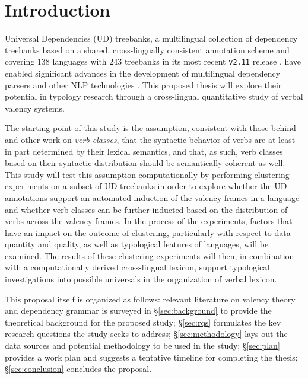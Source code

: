 \section{Introduction}\label{sec:intro}

Universal Dependencies (UD) treebanks, a multilingual collection of dependency treebanks based on a shared, cross-lingually consistent annotation scheme \citep{nivre2020} and covering 138 languages with 243 treebanks in its most recent \texttt{v2.11} release \citep{universaldep}, have enabled significant advances in the development of multilingual dependency parsers and other NLP technologies \citep{zeman2017, zeman2018}. This proposed thesis will explore their potential in typology research through a cross-lingual quantitative study of verbal valency systems.

The starting point of this study is the assumption, consistent with those behind \citet{levin1993} and other work on \textit{verb classes}, that the syntactic behavior of verbs are at least in part determined by their lexical semantics, and that, as such, verb classes based on their syntactic distribution should be semantically coherent as well. This study will test this assumption computationally by performing clustering experiments on a subset of UD treebanks in order to explore whether the UD annotations support an automated induction of the valency frames in a language and whether verb classes can be further inducted based on the distribution of verbs across the valency frames. In the process of the experiments, factors that have an impact on the outcome of clustering, particularly with respect to data quantity and quality, as well as typological features of languages, will be examined. The results of these clustering experiments will then, in combination with a computationally derived cross-lingual lexicon, support typological investigations into possible universals in the organization of verbal lexicon.

This proposal itself is organized as follows: relevant literature on valency theory and dependency grammar is surveyed in \S\ref{sec:background} to provide the theoretical background for the proposed study; \S\ref{sec:rqs} formulates the key research questions the study seeks to address; \S\ref{sec:methodology} lays out the data sources and potential methodology to be used in the study; \S\ref{sec:plan} provides a work plan and suggests a tentative timeline for completing the thesis; \S\ref{sec:conclusion} concludes the proposal.